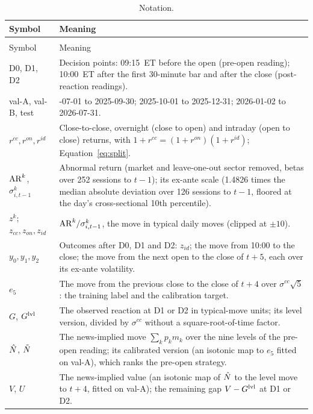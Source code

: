 {\small
\begin{longtable}{@{}>{\raggedright\arraybackslash}p{1.35in}>{\raggedright\arraybackslash}p{4.95in}@{}}
\caption{Notation.}\label{tab:notation} \\
\toprule
Symbol & Meaning \\
\midrule
\endfirsthead
\multicolumn{2}{@{}l}{\textit{Table \ref{tab:notation}, continued}} \\
\toprule
Symbol & Meaning \\
\midrule
\endhead
\bottomrule
\endlastfoot
D0, D1, D2 & Decision points: 09:15~ET before the open (pre-open reading); 10:00~ET after the first 30-minute bar
and after the close (post-reaction readings). \\
val-A, val-B, test & 2025-07-01 to 2025-09-30; 2025-10-01 to 2025-12-31; 2026-01-02 to 2026-07-31. \\
$r^{cc}, r^{on}, r^{id}$ & Close-to-close, overnight (close to open) and intraday (open to close) returns, with
$1 + r^{cc} = (1 + r^{on})(1 + r^{id})$; Equation~\eqref{eq:split}. \\
$\mathrm{AR}^{k}$, $\sigma^{k}_{i,t-1}$ & Abnormal return (market and leave-one-out sector removed, betas over 252
sessions to $t-1$); its ex-ante scale (1.4826 times the median absolute deviation over 126 sessions to $t-1$,
floored at the day's cross-sectional 10th percentile). \\
$z^{k}$; $z_{cc}, z_{on}, z_{id}$ & $\mathrm{AR}^{k}/\sigma^{k}_{i,t-1}$, the move in typical daily moves (clipped at
$\pm 10$). \\
$y_0, y_1, y_2$ & Outcomes after D0, D1 and D2: $z_{id}$; the move from 10:00 to the close; the move from the next
open to the close of $t+5$, each over its ex-ante volatility. \\
$e_5$ & The move from the previous close to the close of $t+4$ over $\sigma^{cc}\sqrt{5}$: the training label and
the calibration target. \\
$G$, $G^{\mathrm{lvl}}$ & The observed reaction at D1 or D2 in typical-move units; its level version, divided by
$\sigma^{cc}$ without a square-root-of-time factor. \\
$\hat N$, $\tilde N$ & The news-implied move $\sum_k p_k m_k$ over the nine levels of the pre-open reading; its
calibrated version (an isotonic map to $e_5$ fitted on val-A), which ranks the pre-open strategy. \\
$V$, $U$ & The news-implied value (an isotonic map of $\hat N$ to the level move to $t+4$, fitted on val-A); the
remaining gap $V - G^{\mathrm{lvl}}$ at D1 or D2. \\

\end{longtable}}
